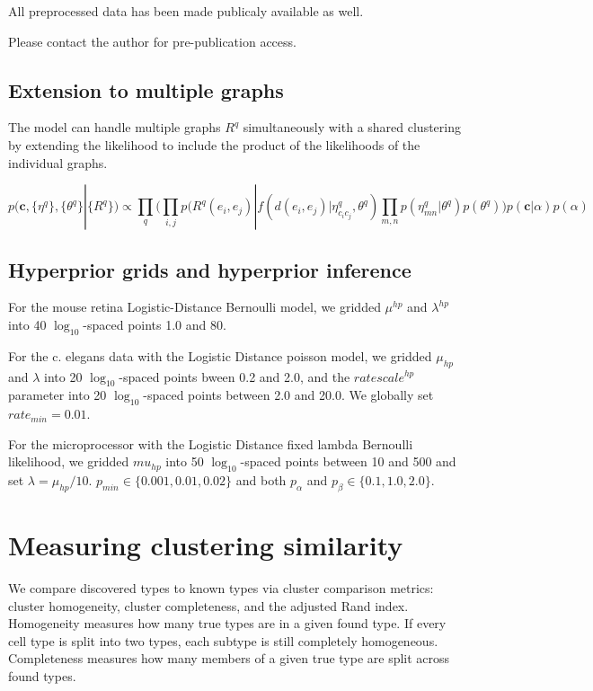 \documentclass{article}
\renewcommand{\vec}[1]{\mathbf{#1}}
\begin{document}
{All preprocessed data has been made publicaly available as well. 

Please contact the author for pre-publication access. 

\subsection*{Extension to multiple graphs}
\label{supp:multigraph}
The model can handle multiple graphs $R^q$ simultaneously with a shared clustering by extending the likelihood to include the product of the likelihoods of the individual graphs. 

\begin{equation}
  p(\vec{c}, \{\eta^q\}, \{\theta^q\} | \{R^q\} ) \propto \prod_q \Bigg(\prod_{i, j} p(R^q(e_i, e_j) | f(d(e_i, e_j) | \eta^q_{c_ic_j}, \theta^q) \prod_{m, n} p(\eta^q_{mn} | \theta^q)  p(\theta^q) \Bigg) p(\vec{c} | \alpha) p(\alpha) 
\end{equation}

\FloatBarrier
\subsection*{Hyperprior grids and hyperprior inference}
\label{supp:hyperpriors}

For the mouse retina Logistic-Distance Bernoulli model, we gridded
$\mu^{hp}$ and $\lambda^{hp}$ into 40 $\log_{10}$-spaced points 1.0
and 80. 

For the c. elegans data with the Logistic Distance poisson model, we
gridded $\mu_{hp}$ and $\lambda$ into 20 $\log_{10}$-spaced points
bween 0.2 and 2.0, and the $ratescale^{hp}$ parameter into 20
$\log_{10}$-spaced points between 2.0 and 20.0. We globally set
$rate_{min}=0.01$.

For the microprocessor with the Logistic Distance fixed lambda
Bernoulli likelihood, we gridded $mu_{hp}$ into 50 $\log_{10}$-spaced
points between 10 and 500 and set $\lambda=\mu_{hp}/10$. $p_{min} \in
\{0.001, 0.01, 0.02\}$ and both $p_\alpha$ and $p_\beta \in \{0.1,
1.0, 2.0\}$.

\section*{Measuring clustering similarity}
We compare discovered types to known types via cluster comparison
metrics: cluster homogeneity, cluster completeness, and the adjusted
Rand index. Homogeneity measures how many true types are in a given
found type. If every cell type is split into two types, each subtype
is still completely homogeneous. Completeness measures how many
members of a given true type are split across found types.

}
\end{document}
